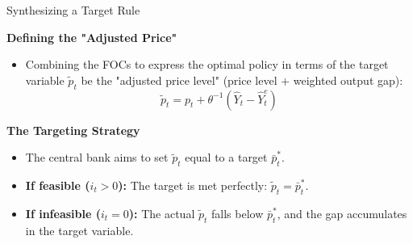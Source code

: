 \documentclass[11pt,aspectratio=169]{beamer}
\begin{document}
\begin{frame}{Synthesizing a Target Rule}
\small

\textbf{Defining the "Adjusted Price"}
\begin{itemize}
    \item Combining the FOCs to express the optimal policy in terms of the target variable $\tilde{p}_{t}$ be the "adjusted price level" (price level + weighted output gap):
    \begin{equation*}
        \tilde{p}_{t} = p_{t} + \theta ^{-1}(\hat{Y}_{t}-\hat{Y}_{t}^{e})
    \end{equation*}
\end{itemize}

\vspace{0.2cm}

\textbf{The Targeting Strategy}
\begin{itemize}
    \item The central bank  aims to set $\tilde{p}_{t}$ equal to a target $\bar{p}_{t}^{\ast }$.
    \item \textbf{If feasible ($i_t > 0$):} The target is met perfectly: $\tilde{p}_{t} = \bar{p}_{t}^{\ast }$.
    \item \textbf{If infeasible ($i_t = 0$):} The actual $\tilde{p}_{t}$ falls below $\bar{p}_{t}^{\ast }$, and the gap accumulates in the target variable.
\end{itemize}
\end{frame}
\end{document}
